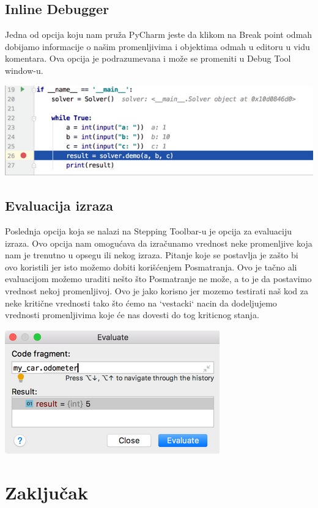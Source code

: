\documentclass[a4paper]{article}
\begin{document}
\subsection{Inline Debugger}
Jedna od opcija koju nam pruža PyCharm jeste da klikom na Break point odmah dobijamo informacije o našim promenljivima i objektima odmah u editoru u vidu komentara. Ova opcija je podrazumevana i može se promeniti u Debug Tool window-u\cite{pyCharm}.


\includegraphics[scale = 0.4]{3}
\subsection{Evaluacija izraza}
Poslednja opcija koja se nalazi na Stepping Toolbar-u je opcija za evaluaciju izraza. Ovo opcija nam omogućava da izračunamo vrednost neke promenljive koja nam je trenutno u opsegu ili nekog izraza\cite{pyCharm}. Pitanje koje se postavlja je zašto bi ovo koristili jer isto možemo dobiti korišćenjem Posmatranja. Ovo je tačno ali evaluacijom možemo uraditi nešto što Posmatranje ne može, a to je da postavimo vrednost nekoj promenljivoj\cite{pyCharm}. Ovo je jako korisno jer mozemo testirati naš kod za neke kritične vrednosti tako što ćemo na `vestacki` nacin da dodeljujemo vrednosti promenljivima koje će nas dovesti do tog kriticnog stanja.

\includegraphics[scale = 0.4]{4}
\section{Zaključak}
\label{sec:zakljucak}
\end{document}
